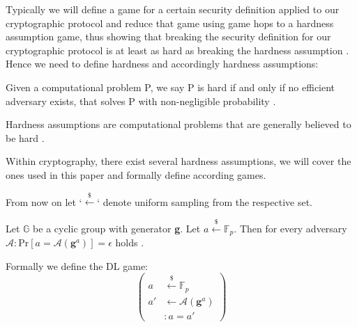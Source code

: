 Typically we will define a game for a certain security definition applied to our cryptographic protocol and reduce that game using game hops to a hardness assumption game, thus showing that breaking the security definition for our cryptographic protocol is at least as hard as breaking the hardness assumption \parencite{boneh_shoup}. Hence we need to define hardness and accordingly hardness assumptions:

\begin{definition}[hardness]
    Given a computational problem P, we say P is hard if and only if no efficient adversary exists, that solves P with non-negligible probability \parencite{ac_handbook}. 
\end{definition}

\begin{definition}
    \label{hardness_asmp_defs}
Hardness assumptions are computational problems that are generally believed to be hard \parencite{boneh_shoup,ac_handbook}.
\end{definition}

Within cryptography, there exist several hardness assumptions, we will cover the ones used in this paper and formally define according games. 

From now on let `$\overset{{\scriptscriptstyle\$}}{\leftarrow}$` denote uniform sampling from the respective set. 

\begin{definition}
    \label{DL_def}
    Let $\mathbb{G}$ be a cyclic group with generator \textbf{g}.
    Let $a \overset{{\scriptscriptstyle\$}}{\leftarrow} \mathbb{F}_p$. Then for every adversary $\mathcal{A}: \text{Pr}[a = \mathcal{A}(\textbf{g}^a)] = \epsilon$  holds \parencite{KZG}.

    Formally we define the DL game: 
    \begin{equation*}
        \left(
            \begin{aligned}
                a & \overset{{\scriptscriptstyle\$}}{\leftarrow} \mathbb{F}_p \\
                a' & \leftarrow \mathcal{A}(\textbf{g}^a) \\
                & : a = a'
            \end{aligned}
        \right)
    \end{equation*}
\end{definition}

